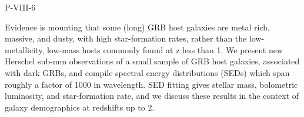 P-VIII-6


\bigskip



\bigskip

\noindent Evidence is mounting that some (long) GRB host galaxies are metal rich, massive, and dusty, with high star-formation rates, rather than the low-metallicity, low-mass hosts commonly found at z less than 1. We present new Herschel sub-mm observations of a small sample of GRB host galaxies, associated with dark GRBs, and compile spectral energy distributions (SEDs) which span roughly
a factor of 1000 in wavelength.  SED fitting gives stellar mass, bolometric
luminosity, and star-formation rate, and we discuss these results in the
context of galaxy demographics at redshifts up to 2.
